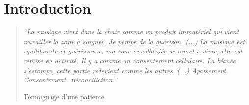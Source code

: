
\chapter{Introduction}





\begin{quotation}
 \textit{``La musique vient dans la chair comme un produit immatériel
 qui vient travailler la zone à soigner. Je pompe de la
 guérison.
 (...)
 La musique est équilibrante et guérisseuse, ma zone
 anesthésiée se remet à vivre, elle est remise en activité.
 Il y a comme un consentement cellulaire.
La béance s'estompe, cette
partie redevient comme les autres. (...)
Apaisement. Consentement. Réconciliation.''}

Témoignage d'une patiente

\end{quotation}



